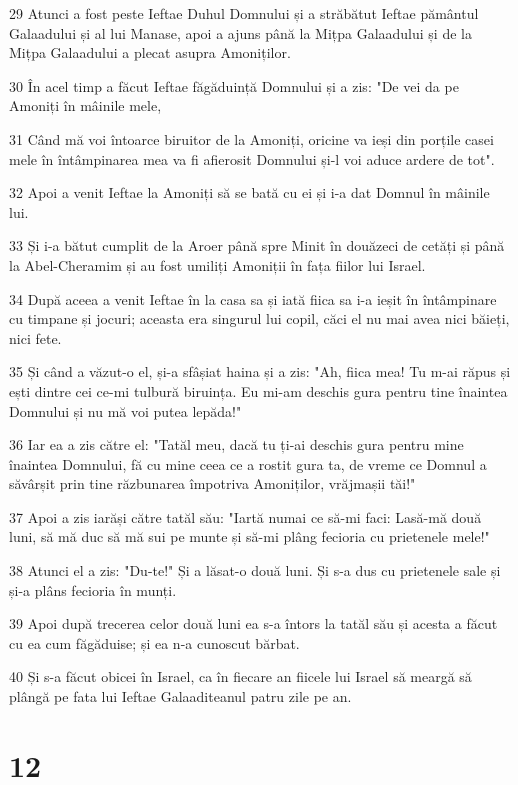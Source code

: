 \par 29 Atunci a fost peste Ieftae Duhul Domnului și a străbătut Ieftae pământul Galaadului și al lui Manase, apoi a ajuns până la Mițpa Galaadului și de la Mițpa Galaadului a plecat asupra Amoniților.
\par 30 În acel timp a făcut Ieftae făgăduință Domnului și a zis: "De vei da pe Amoniți în mâinile mele,
\par 31 Când mă voi întoarce biruitor de la Amoniți, oricine va ieși din porțile casei mele în întâmpinarea mea va fi afierosit Domnului și-l voi aduce ardere de tot".
\par 32 Apoi a venit Ieftae la Amoniți să se bată cu ei și i-a dat Domnul în mâinile lui.
\par 33 Și i-a bătut cumplit de la Aroer până spre Minit în douăzeci de cetăți și până la Abel-Cheramim și au fost umiliți Amoniții în fața fiilor lui Israel.
\par 34 După aceea a venit Ieftae în la casa sa și iată fiica sa i-a ieșit în întâmpinare cu timpane și jocuri; aceasta era singurul lui copil, căci el nu mai avea nici băieți, nici fete.
\par 35 Și când a văzut-o el, și-a sfâșiat haina și a zis: "Ah, fiica mea! Tu m-ai răpus și ești dintre cei ce-mi tulbură biruința. Eu mi-am deschis gura pentru tine înaintea Domnului și nu mă voi putea lepăda!"
\par 36 Iar ea a zis către el: "Tatăl meu, dacă tu ți-ai deschis gura pentru mine înaintea Domnului, fă cu mine ceea ce a rostit gura ta, de vreme ce Domnul a săvârșit prin tine răzbunarea împotriva Amoniților, vrăjmașii tăi!"
\par 37 Apoi a zis iarăși către tatăl său: "Iartă numai ce să-mi faci: Lasă-mă două luni, să mă duc să mă sui pe munte și să-mi plâng fecioria cu prietenele mele!"
\par 38 Atunci el a zis: "Du-te!" Și a lăsat-o două luni. Și s-a dus cu prietenele sale și și-a plâns fecioria în munți.
\par 39 Apoi după trecerea celor două luni ea s-a întors la tatăl său și acesta a făcut cu ea cum făgăduise; și ea n-a cunoscut bărbat.
\par 40 Și s-a făcut obicei în Israel, ca în fiecare an fiicele lui Israel să meargă să plângă pe fata lui Ieftae Galaaditeanul patru zile pe an.

\chapter{12}

